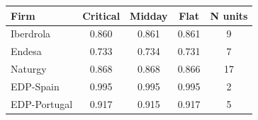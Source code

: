 \begin{tabular}{l c c c c}
\toprule
Firm & Critical & Midday & Flat & N units \\
\midrule
Iberdrola & 0.860 & 0.861 & 0.861 & 9 \\
Endesa & 0.733 & 0.734 & 0.731 & 7 \\
Naturgy & 0.868 & 0.868 & 0.866 & 17 \\
EDP-Spain & 0.995 & 0.995 & 0.995 & 2 \\
EDP-Portugal & 0.917 & 0.915 & 0.917 & 5 \\
\bottomrule
\end{tabular}
